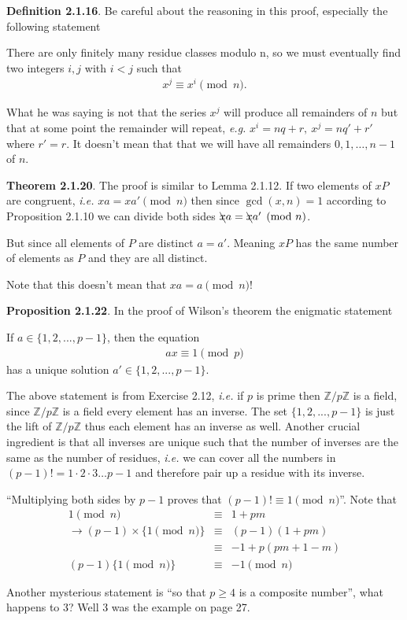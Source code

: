 \documentclass[aps,preprint,preprintnumbers,nofootinbib,showpacs,prd]{revtex4-1}
\newcommand{\ie}{{\it i.e.} }
\newcommand{\eg}{{\it e.g.} }
\newcommand{\nbea}{\begin{eqnarray*}}
\newcommand{\neea}{\end{eqnarray*}}
\begin{document}
{\bf Definition 2.1.16}. Be careful about the reasoning in this proof, especially the following statement

There are only finitely many residue classes modulo n, so we must eventually ﬁnd two integers $i, j$ with $i < j$ such that
%
\nbea
x^j \equiv x^i \pmod{n}.
\neea
%

What he was saying is not that the series $x^j$ will produce all remainders of $n$ but that at some point the remainder will repeat, \eg $x^i = nq + r,~x^j = nq' + r'$ where $r' = r$. It doesn't mean that that we will have all remainders $0,1, \dots, n-1$ of $n$.

{\bf Theorem 2.1.20}. The proof is similar to Lemma 2.1.12. If two elements of $xP$ are congruent, \ie $xa = xa' \pmod{n}$ then since $\gcd(x,n)=1$ according to Proposition 2.1.10 we can divide both sides $\bcancel{x}a = \bcancel{x}a' \pmod{n}$.

But since all elements of $P$ are distinct $a = a'$. Meaning $xP$ has the same number of elements as $P$ and they are all distinct.

Note that this doesn't mean that $xa = a \pmod{n}$!

{\bf Proposition 2.1.22}. In the proof of Wilson's theorem the enigmatic statement

If $a \in \{1, 2, . . . , p - 1\}$, then the equation
%
\nbea
ax \equiv 1 \pmod{p}
\neea
%
has a unique solution $a' \in \{1, 2, . . . , p - 1\}$. 

The above statement is from Exercise 2.12, \ie if $p$ is prime then $\mathbb{Z}/p\mathbb{Z}$ is a field, since $\mathbb{Z}/p\mathbb{Z}$ is a field every element has an inverse. The set $\{1, 2, . . . , p - 1\}$ is just the lift of $\mathbb{Z}/p\mathbb{Z}$ thus each element has an inverse as well. Another crucial ingredient is that all inverses are unique such that the number of inverses are the same as the number of residues, \ie we can cover all the numbers in $(p-1)! = 1\cdot 2\cdot 3 \dots p-1$ and therefore pair up a residue with its inverse.

``Multiplying both sides by $p-1$ proves that $(p-1)! \equiv 1 \pmod{n}$''. Note that
%
\nbea
1 \pmod{n} & \equiv & 1 + pm \\
\to (p-1) \times \{1 \pmod{n}\} & \equiv & (p-1)(1 + pm) \\
& \equiv & -1 + p(pm + 1 - m) \\
(p-1) \{1\pmod{n}\} & \equiv & -1 \pmod{n}
\neea
%

Another mysterious statement is ``so that $p \ge 4$ is a composite number'', what happens to 3? Well 3 was the example on page 27.
\end{document}
